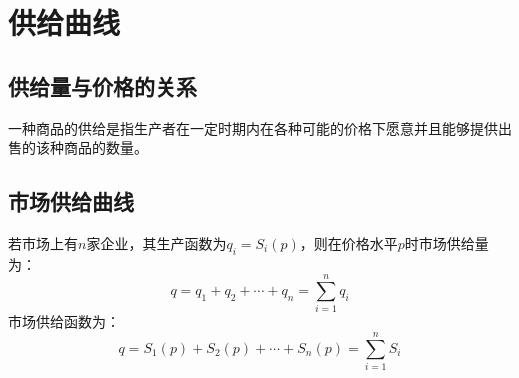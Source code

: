 \section{供给曲线}

\subsection{供给量与价格的关系}

一种商品的供给是指生产者在一定时期内在各种可能的价格下愿意并且能够提供出售的该种商品的数量。

\subsection{市场供给曲线}
若市场上有$n$家企业，其生产函数为$q_i = S_i(p)$，则在价格水平$p$时市场供给量为：
\begin{equation}
q=q_1+q_2+\cdots+q_n = \sum\limits_{i = 1}^n {{q_i}}
\label{eq:individual-supply-quantity-to-market-curve}
\end{equation}
市场供给函数为：
\begin{equation}
q=S_1(p) + S_2(p) + \cdots + S_n(p) = \sum\limits_{i = 1}^n {S_i}
\label{eq:individual-supply-curves-to-market-curve}
\end{equation}

